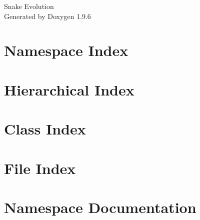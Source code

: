 \documentclass[twoside]{book}
\newcommand{\+}{\discretionary{\mbox{\scriptsize$\hookleftarrow$}}{}{}}
\newcommand{\clearemptydoublepage}{%
    \newpage{\pagestyle{empty}\cleardoublepage}%
  }
\begin{document}
  \raggedbottom
    \hypersetup{pageanchor=false,
                bookmarksnumbered=true,
                pdfencoding=unicode
               }
  \begin{titlepage}
  \vspace*{7cm}
  \begin{center}%
  {\Large Snake Evolution}\\
  \vspace*{1cm}
  {\large Generated by Doxygen 1.9.6}\\
  \end{center}
  \end{titlepage}
  \clearemptydoublepage
  \tableofcontents
  \clearemptydoublepage
  \hypersetup{pageanchor=true}
\chapter{Namespace Index}

\chapter{Hierarchical Index}

\chapter{Class Index}

\chapter{File Index}

\chapter{Namespace Documentation}







\end{document}
